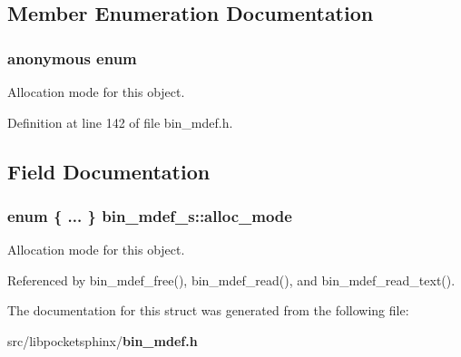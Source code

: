 \subsection{Member Enumeration Documentation}
\subsubsection[{anonymous enum}]{\setlength{\rightskip}{0pt plus 5cm}anonymous enum}\label{structbin__mdef__s_aecae45462313d38bc6474d8ee57fe9f3}


Allocation mode for this object. 



Definition at line 142 of file bin\+\_\+mdef.\+h.



\subsection{Field Documentation}
\subsubsection[{alloc\+\_\+mode}]{\setlength{\rightskip}{0pt plus 5cm}enum \{ ... \}   bin\+\_\+mdef\+\_\+s\+::alloc\+\_\+mode}\label{structbin__mdef__s_ab8d852b6cc4f9899da72da03d1607c92}


Allocation mode for this object. 



Referenced by bin\+\_\+mdef\+\_\+free(), bin\+\_\+mdef\+\_\+read(), and bin\+\_\+mdef\+\_\+read\+\_\+text().



The documentation for this struct was generated from the following file\+:\begin{DoxyCompactItemize}
\item 
src/libpocketsphinx/{\bf bin\+\_\+mdef.\+h}\end{DoxyCompactItemize}
